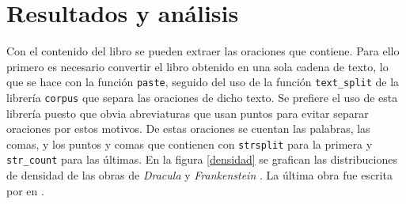 \documentclass[paper=leter, fontsize=11pt]{scrartcl}
\numberwithin{equation}{section}		%
\numberwithin{figure}{section}			%
\numberwithin{table}{section}				%
\begin{document}
\section{Resultados y análisis}
Con el contenido del libro se pueden extraer las oraciones que contiene. Para ello primero es necesario convertir el libro obtenido en una sola cadena de texto, lo que se hace con la función \texttt{paste}, seguido del uso de la función \texttt{text\_split} de la librería \texttt{corpus} que separa las oraciones de dicho texto. Se prefiere el uso de esta librería puesto que obvia abreviaturas que usan puntos para evitar separar oraciones por estos motivos. De estas oraciones se cuentan las palabras, las comas, y los puntos y comas que contienen con \texttt{strsplit} para la primera y \texttt{str\_count} para las últimas. En la figura \ref{densidad} se grafican las distribuciones de densidad de las obras de \textit{Dracula} y \textit{Frankenstein} \cite{frankenstein1831}. La última obra fue escrita por \citeauthor{frankenstein1831} en \citeyear{frankenstein1831}.
\end{document}
